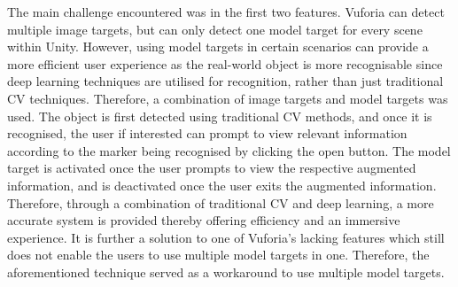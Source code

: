 \documentclass{aifyp}
\begin{document}
The main challenge encountered was in the first two features. Vuforia can detect multiple image targets, but can only detect one model target for every scene within Unity. However, using model targets in certain scenarios can provide a more efficient user experience as the real-world object is more recognisable since deep learning techniques are utilised for recognition, rather than just traditional CV techniques. Therefore, a combination of image targets and model targets was used. The object is first detected using traditional CV methods, and once it is recognised, the user if interested can prompt to view relevant information according to the marker being recognised by clicking the open button. The model target is activated once the user prompts to view the respective augmented information, and is deactivated once the user exits the augmented information. Therefore, through a combination of traditional CV and deep learning, a more accurate system is provided thereby offering efficiency and an immersive experience. It is further a solution to one of Vuforia’s lacking features which still does not enable the users to use multiple model targets in one. Therefore, the aforementioned technique served as a workaround to use multiple model targets.
\end{document}
